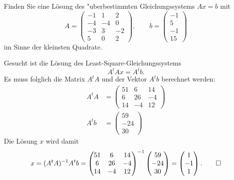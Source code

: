 Finden Sie eine Lösung des "uberbestimmten Gleichungssystems $Ax=b$ mit 
\[
A=\begin{pmatrix}
-1& 1& 2\\
-4&-4& 0\\
-3& 3&-2\\
 5& 0& 2
\end{pmatrix},
\qquad
b=\begin{pmatrix}
-1\\5\\-1\\15
\end{pmatrix}
\]
im Sinne der kleinsten Quadrate.


\begin{loesung}
Gesucht ist die Lösung des Least-Square-Gleichungssystems
\[
 A^tA x= A^tb.
\]
Es muss folglich die Matrix $A^tA$ und der Vektor $A^tb$
berechnet werden:
\begin{align*}
A^tA
&=
\begin{pmatrix}
   51 &  6 & 14 \\
    6 & 26 & -4 \\
   14 & -4 & 12
\end{pmatrix}
\\
A^tb
&=
\begin{pmatrix}
59\\-24\\30
\end{pmatrix}
\end{align*}
Die Lösung $x$ wird damit
\[
x
=
(A^tA)^{-1} A^tb
=
\begin{pmatrix}
   51 &  6 & 14 \\
    6 & 26 & -4 \\
   14 & -4 & 12
\end{pmatrix}^{-1}
\begin{pmatrix}
59\\-24\\30
\end{pmatrix}
=
\begin{pmatrix} 1\\-1\\1 \end{pmatrix}.\qedhere
\]
\end{loesung}

